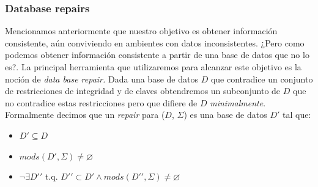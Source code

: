 \documentclass[11pt,a4paper,twoside]{tesis}
\begin{document}
\subsubsection{Database repairs}

Mencionamos anteriormente que nuestro objetivo es obtener información consistente, aún conviviendo en ambientes con datos inconsistentes. ¿Pero como podemos obtener información consistente a partir de una base de datos que no lo es?. La principal herramienta que utilizaremos para alcanzar este objetivo es la noción de \textit{data base repair.} Dada una base de datos $D$ que contradice un conjunto de restricciones de integridad y de claves obtendremos un subconjunto de $D$ que no contradice estas restricciones pero que difiere de $D$ \textit{minimalmente}. Formalmente decimos que un \textit{repair} para ($D$, $\Sigma$) es una base de datos $D\prime$ tal que:
\begin{itemize}
    \item $D\prime \subseteq D$
    \item $mods(D\prime, \Sigma) \neq \varnothing $
    \item $\neg \exists D\prime \prime$ t.q. $D\prime\prime \subset D\prime \land mods(D\prime \prime, \Sigma) \neq \varnothing$
\end{itemize}
\end{document}
